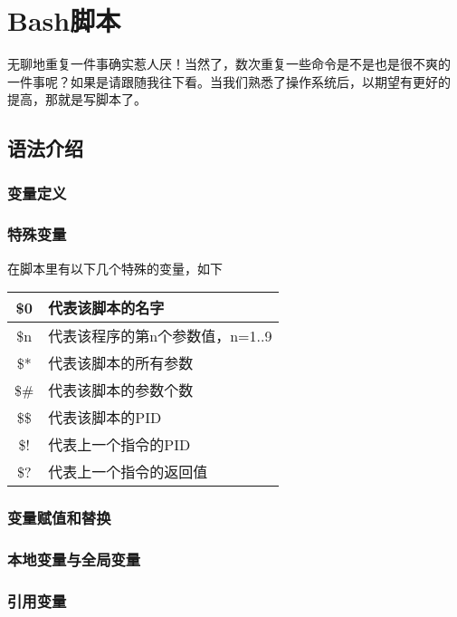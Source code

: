 \chapter{Bash脚本}
\label{sec:shellScript}

无聊地重复一件事确实惹人厌！当然了，数次重复一些命令是不是也是很不爽的
一件事呢？如果是请跟随我往下看。当我们熟悉了操作系统后，以期望有更好的
提高，那就是写脚本了。

\section{语法介绍}

\subsection{变量定义}

\subsection{特殊变量}

在脚本里有以下几个特殊的变量，如下

\begin{table}[h]
  \centering
  \begin{tabular}{c|l}
    \hline
    \$0   & 代表该脚本的名字 \\
    \hline
    \$n   & 代表该程序的第n个参数值，n=1..9 \\
    \hline
    \$*   & 代表该脚本的所有参数 \\
    \hline
    \$\#  & 代表该脚本的参数个数 \\
    \hline
    \$\$  & 代表该脚本的PID \\
    \hline
    \$!   & 代表上一个指令的PID \\
    \hline
    \$?   & 代表上一个指令的返回值 \\
    \hline
  \end{tabular}
\end{table}

\subsection{变量赋值和替换}

\subsection{本地变量与全局变量}

\subsection{引用变量}

